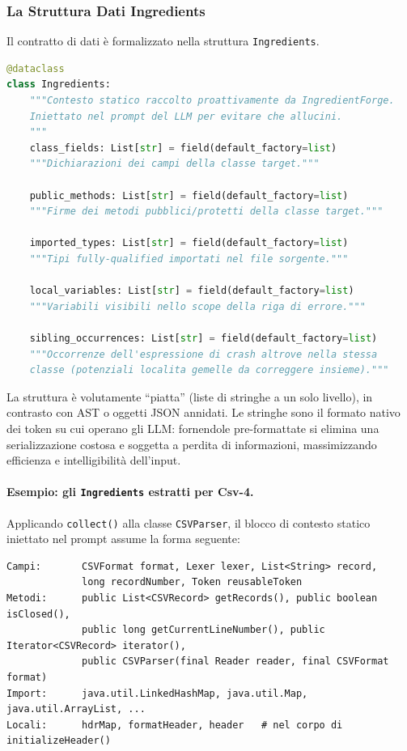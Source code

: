 \subsubsection{La Struttura Dati Ingredients}
\label{subsubsec:3_3_2_4}
Il contratto di dati è formalizzato nella struttura \texttt{Ingredients}.

\begin{lstlisting}[language=Python]
@dataclass
class Ingredients:
    """Contesto statico raccolto proattivamente da IngredientForge.
    Iniettato nel prompt del LLM per evitare che allucini.
    """
    class_fields: List[str] = field(default_factory=list)
    """Dichiarazioni dei campi della classe target."""

    public_methods: List[str] = field(default_factory=list)
    """Firme dei metodi pubblici/protetti della classe target."""

    imported_types: List[str] = field(default_factory=list)
    """Tipi fully-qualified importati nel file sorgente."""

    local_variables: List[str] = field(default_factory=list)
    """Variabili visibili nello scope della riga di errore."""

    sibling_occurrences: List[str] = field(default_factory=list)
    """Occorrenze dell'espressione di crash altrove nella stessa
    classe (potenziali localita gemelle da correggere insieme)."""
\end{lstlisting}

La struttura è volutamente ``piatta'' (liste di stringhe a un solo livello), in contrasto con AST o oggetti JSON
annidati. Le stringhe sono il formato nativo dei token su cui operano gli LLM: fornendole pre-formattate si
elimina una serializzazione costosa e soggetta a perdita di informazioni, massimizzando efficienza e
intelligibilità dell'input.

\paragraph{Esempio: gli \texttt{Ingredients} estratti per Csv-4.} Applicando \texttt{collect()} alla classe
\texttt{CSVParser}, il blocco di contesto statico iniettato nel prompt assume la forma seguente:

\begin{lstlisting}
Campi:       CSVFormat format, Lexer lexer, List<String> record,
             long recordNumber, Token reusableToken
Metodi:      public List<CSVRecord> getRecords(), public boolean isClosed(),
             public long getCurrentLineNumber(), public Iterator<CSVRecord> iterator(),
             public CSVParser(final Reader reader, final CSVFormat format)
Import:      java.util.LinkedHashMap, java.util.Map, java.util.ArrayList, ...
Locali:      hdrMap, formatHeader, header   # nel corpo di initializeHeader()
\end{lstlisting}

